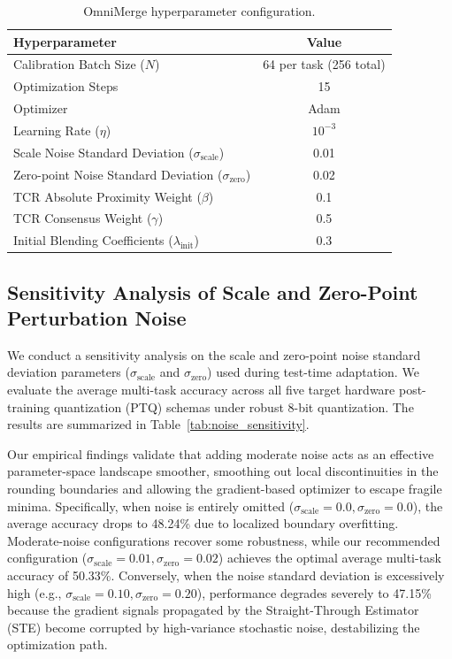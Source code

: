 \documentclass{article}
\theoremstyle{plain}
\theoremstyle{definition}
\theoremstyle{remark}
\begin{document}
\begin{table}[h]
\caption{OmniMerge hyperparameter configuration.}
\label{tab:hyperparams}
\vskip 0.15in
\begin{center}
\begin{small}
\begin{sc}
\begin{tabular}{lc}
\toprule
Hyperparameter & Value \\
\midrule
Calibration Batch Size ($N$) & 64 per task (256 total) \\
Optimization Steps & 15 \\
Optimizer & Adam \\
Learning Rate ($\eta$) & $10^{-3}$ \\
Scale Noise Standard Deviation ($\sigma_{\text{scale}}$) & 0.01 \\
Zero-point Noise Standard Deviation ($\sigma_{\text{zero}}$) & 0.02 \\
TCR Absolute Proximity Weight ($\beta$) & 0.1 \\
TCR Consensus Weight ($\gamma$) & 0.5 \\
Initial Blending Coefficients ($\lambda_{\text{init}}$) & 0.3 \\
\bottomrule
\end{tabular}
\end{sc}
\end{small}
\end{center}
\vskip -0.1in
\end{table}

\subsection{Sensitivity Analysis of Scale and Zero-Point Perturbation Noise}
We conduct a sensitivity analysis on the scale and zero-point noise standard deviation parameters ($\sigma_{\text{scale}}$ and $\sigma_{\text{zero}}$) used during test-time adaptation. We evaluate the average multi-task accuracy across all five target hardware post-training quantization (PTQ) schemas under robust 8-bit quantization. The results are summarized in Table~\ref{tab:noise_sensitivity}.

Our empirical findings validate that adding moderate noise acts as an effective parameter-space landscape smoother, smoothing out local discontinuities in the rounding boundaries and allowing the gradient-based optimizer to escape fragile minima. Specifically, when noise is entirely omitted ($\sigma_{\text{scale}} = 0.0, \sigma_{\text{zero}} = 0.0$), the average accuracy drops to 48.24\% due to localized boundary overfitting. Moderate-noise configurations recover some robustness, while our recommended configuration ($\sigma_{\text{scale}} = 0.01, \sigma_{\text{zero}} = 0.02$) achieves the optimal average multi-task accuracy of 50.33\%. Conversely, when the noise standard deviation is excessively high (e.g., $\sigma_{\text{scale}} = 0.10, \sigma_{\text{zero}} = 0.20$), performance degrades severely to 47.15\% because the gradient signals propagated by the Straight-Through Estimator (STE) become corrupted by high-variance stochastic noise, destabilizing the optimization path.
\end{document}
